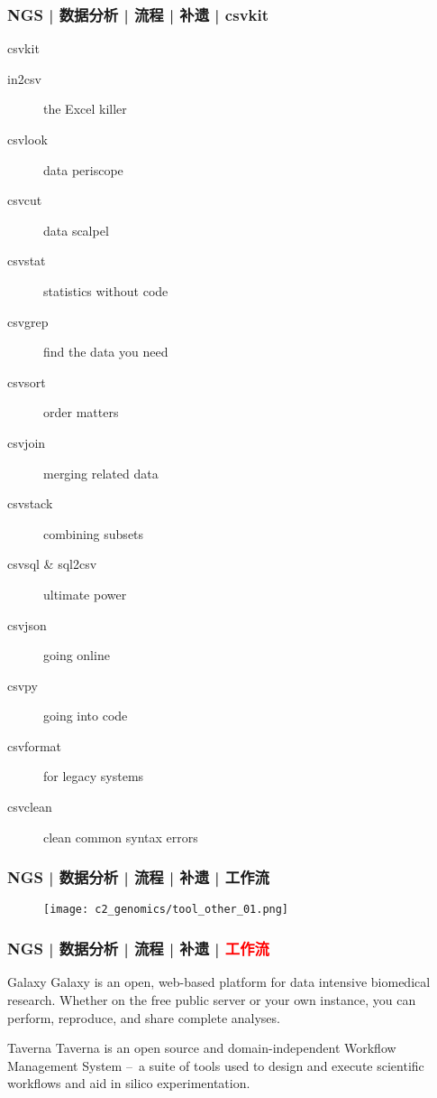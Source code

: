 \begin{frame}
  \frametitle{NGS | 数据分析 | 流程 | 补遗 | csvkit}
  \begin{block}{csvkit}
    \begin{description}
      \item[in2csv] the Excel killer
      \item[csvlook] data periscope
      \item[csvcut] data scalpel
      \item[csvstat] statistics without code
      \item[csvgrep] find the data you need
      \item[csvsort] order matters
      \item[csvjoin] merging related data
      \item[csvstack] combining subsets
      \item[csvsql \& sql2csv] ultimate power
      \item[csvjson] going online
      \item[csvpy] going into code
      \item[csvformat] for legacy systems
      \item[csvclean] clean common syntax errors
    \end{description}
  \end{block}
\end{frame}

\begin{frame}
  \frametitle{NGS | 数据分析 | 流程 | 补遗 | 工作流}
  \begin{figure}
    \centering
    \texttt{[image: c2\_genomics/tool\_other\_01.png]}
  \end{figure}
\end{frame}

\begin{frame}
  \frametitle{NGS | 数据分析 | 流程 | 补遗 | \textcolor{red}{工作流}}
  \begin{block}{Galaxy}
    Galaxy is an open, web-based platform for data intensive biomedical research. Whether on the free public server or your own instance, you can perform, reproduce, and share complete analyses.
  \end{block}
  \pause
  \begin{block}{Taverna}
    Taverna is an open source and domain-independent Workflow Management System –\ a suite of tools used to design and execute scientific workflows and aid in silico experimentation.
  \end{block}
\end{frame}


